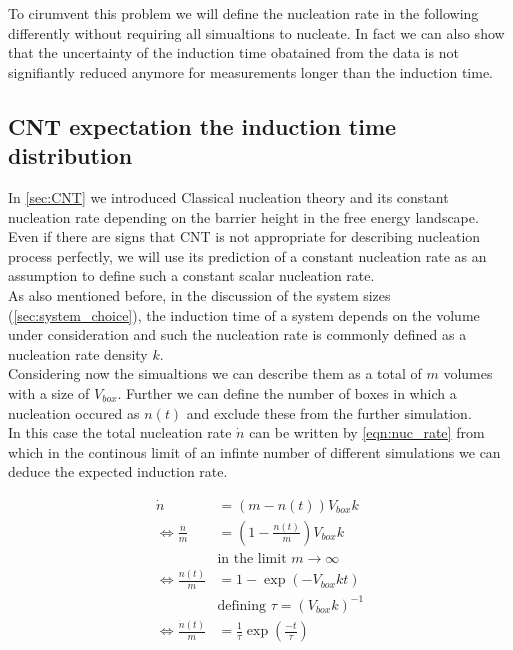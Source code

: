 To cirumvent this problem we will define the nucleation rate in the following differently without requiring all simualtions to nucleate. In fact we can also show that the uncertainty of the induction time obatained from the data is not signifiantly reduced anymore for measurements longer than the induction time.\\     

\subsection{CNT expectation the induction time distribution}
\label{sec:induction_time_expectation}
In \autoref{sec:CNT} we introduced Classical nucleation theory and its constant nucleation rate depending on the barrier height in the free energy landscape. Even if there are signs that CNT is not appropriate for describing nucleation process perfectly, we will use its prediction of a constant nucleation rate as an assumption to define such a constant scalar nucleation rate.\\

As also mentioned before, in the discussion of the system sizes (\autoref{sec:system_choice}), the induction time of a system depends on the volume under consideration and such the nucleation rate is commonly defined as a nucleation rate density $k$.\\ 
Considering now the simualtions we can describe them as a total of $m$ volumes with a size of $V_{box}$.  Further we can define the number of boxes in which a nucleation occured as $n(t)$ and exclude these from the further simulation.\\

In this case the total nucleation rate $ \dot{n} $ can be written by \autoref{eqn:nuc_rate} from which in the continous limit of an infinte number of different simulations we can deduce the expected induction rate.

\begin{align}
\label{eqn:nuc_rate}
\dot{n} &= (m - n(t))V_{box}k\\
\Leftrightarrow \frac{\dot{n}}{m} &= (1 - \frac{n(t)}{m})V_{box}k\\
 &  \text{in the limit } m \rightarrow \infty \nonumber\\
\Leftrightarrow \frac{n(t)}{m} &= 1 - \exp\left( -V_{box} k t \right)\\
 &  \text{defining } \tau = (V_{box} k)^{-1} \nonumber\\
\label{eqn:nuc_rate_result}
\Leftrightarrow \frac{\dot{n}(t)}{m} &= \frac{1}{\tau} \exp\left( \frac{-t}{\tau} \right) 
\end{align}

